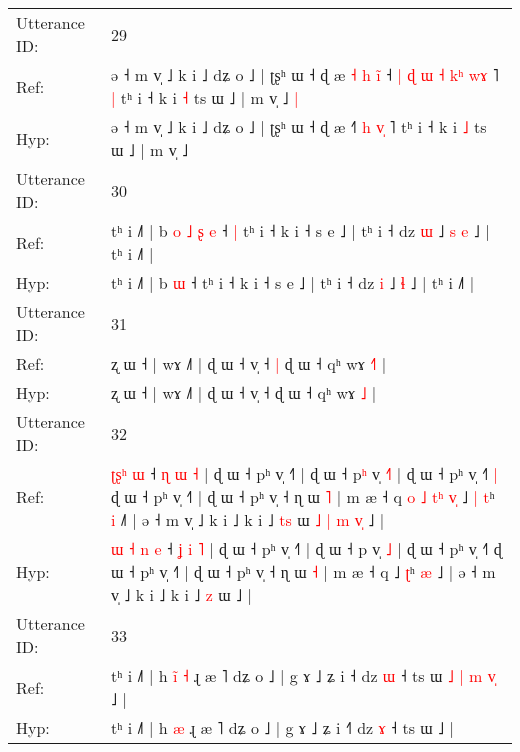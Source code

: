 \documentclass[10pt]{article}
\DeclareRobustCommand{\hl}[1]{{\textcolor{red}{#1}}}
\begin{document}
\begin{longtable}{ll}
 \\
\midrule
Utterance ID: & 29 \\
Ref: & ə ˧ m v̩ ˩ k i ˩ dʑ o ˩ | ʈʂʰ ɯ ˧ ɖ æ\hl{ }\hl{˧}\hl{ }\hl{h}\hl{ }\hl{i}\hl{̃} ˧\hl{ }\hl{|}\hl{ }\hl{ɖ}\hl{ }\hl{ɯ}\hl{ }\hl{˧} \hl{k}\hl{ʰ} \hl{w}\hl{ɤ} ˥\hl{ }\hl{|} tʰ i ˧ k i \hl{˧} ts ɯ ˩ | m v̩ ˩\hl{ }\hl{|}
 \\
Hyp: & ə ˧ m v̩ ˩ k i ˩ dʑ o ˩ | ʈʂʰ ɯ ˧ ɖ æ\hl{}\hl{}\hl{}\hl{}\hl{}\hl{}\hl{} ˧\hl{}\hl{}\hl{}\hl{}\hl{}\hl{}\hl{}\hl{˥} \hl{}\hl{h} \hl{v}\hl{̩} ˥\hl{}\hl{} tʰ i ˧ k i \hl{˩} ts ɯ ˩ | m v̩ ˩\hl{}\hl{}
 \\
\midrule
Utterance ID: & 30 \\
Ref: & tʰ i ˩˥ | b\hl{ }\hl{o}\hl{ }\hl{˩}\hl{ }\hl{ʂ} \hl{e} ˧\hl{ }\hl{|} tʰ i ˧ k i ˧ s e ˩ | tʰ i ˧ dz \hl{ɯ} ˩\hl{ }\hl{s} \hl{e} ˩ | tʰ i ˩˥ |
 \\
Hyp: & tʰ i ˩˥ | b\hl{}\hl{}\hl{}\hl{}\hl{}\hl{} \hl{ɯ} ˧\hl{}\hl{} tʰ i ˧ k i ˧ s e ˩ | tʰ i ˧ dz \hl{i} ˩\hl{}\hl{} \hl{ɬ} ˩ | tʰ i ˩˥ |
 \\
\midrule
Utterance ID: & 31 \\
Ref: & ʐ ɯ ˧ | wɤ ˩˥ | ɖ ɯ ˧ v̩ ˧\hl{ }\hl{|} ɖ ɯ ˧ qʰ wɤ \hl{˧}\hl{˥} |
 \\
Hyp: & ʐ ɯ ˧ | wɤ ˩˥ | ɖ ɯ ˧ v̩ ˧\hl{}\hl{} ɖ ɯ ˧ qʰ wɤ \hl{}\hl{˩} |
 \\
\midrule
Utterance ID: & 32 \\
Ref: & \hl{}\hl{}\hl{ʈ}\hl{ʂ}\hl{ʰ} \hl{ɯ} ˧ \hl{ɳ} \hl{ɯ} \hl{˧} | ɖ ɯ ˧ pʰ v̩ ˧˥ | ɖ ɯ ˧ p\hl{ʰ} v̩ \hl{˧}\hl{˥} | ɖ ɯ ˧ pʰ v̩ ˧˥\hl{ }\hl{|} ɖ ɯ ˧ pʰ v̩ ˧˥ | ɖ ɯ ˧ pʰ v̩ ˧ ɳ ɯ \hl{˥} | m æ ˧ q\hl{ }\hl{o}\hl{ }\hl{˩}\hl{ }\hl{t}\hl{ʰ}\hl{ }\hl{v}\hl{̩} ˩\hl{ }\hl{|} \hl{t}ʰ \hl{i} ˩\hl{˥} | ə ˧ m v̩ ˩ k i ˩ k i ˩ \hl{t}\hl{s} ɯ\hl{ }\hl{˩}\hl{ }\hl{|}\hl{ }\hl{m}\hl{ }\hl{v}\hl{̩} ˩ |
 \\
Hyp: & \hl{ɯ}\hl{ }\hl{˧}\hl{ }\hl{n} \hl{e} ˧ \hl{ʝ} \hl{i} \hl{˥} | ɖ ɯ ˧ pʰ v̩ ˧˥ | ɖ ɯ ˧ p\hl{} v̩ \hl{}\hl{˩} | ɖ ɯ ˧ pʰ v̩ ˧˥\hl{}\hl{} ɖ ɯ ˧ pʰ v̩ ˧˥ | ɖ ɯ ˧ pʰ v̩ ˧ ɳ ɯ \hl{˧} | m æ ˧ q\hl{}\hl{}\hl{}\hl{}\hl{}\hl{}\hl{}\hl{}\hl{}\hl{} ˩\hl{}\hl{} \hl{ʈ}ʰ \hl{æ} ˩\hl{} | ə ˧ m v̩ ˩ k i ˩ k i ˩ \hl{}\hl{z} ɯ\hl{}\hl{}\hl{}\hl{}\hl{}\hl{}\hl{}\hl{}\hl{} ˩ |
 \\
\midrule
Utterance ID: & 33 \\
Ref: & tʰ i ˩˥ | h\hl{ }\hl{i}\hl{̃} \hl{˧} ɻ æ ˥ dʑ o ˩ | g ɤ ˩ ʑ i ˧\hl{} dz \hl{ɯ} ˧ ts ɯ\hl{ }\hl{˩}\hl{ }\hl{|}\hl{ }\hl{m}\hl{ }\hl{v}\hl{̩} ˩ |
 \\
Hyp: & tʰ i ˩˥ | h\hl{}\hl{}\hl{} \hl{æ} ɻ æ ˥ dʑ o ˩ | g ɤ ˩ ʑ i ˧\hl{˥} dz \hl{ɤ} ˧ ts ɯ\hl{}\hl{}\hl{}\hl{}\hl{}\hl{}\hl{}\hl{}\hl{} ˩ |

\end{longtable}
\end{document}
